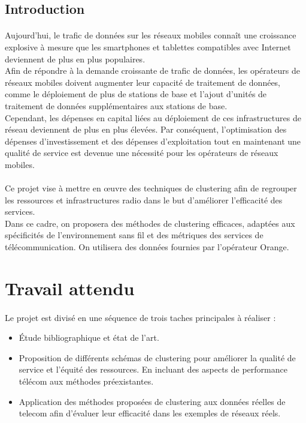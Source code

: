 \documentclass{article}
\begin{document}
  \begin{center}
    \section*{\LARGE{Introduction}}
\end{center}
\Large{\paragraph{}
      Aujourd'hui, le trafic de données sur les réseaux mobiles connaît une croissance explosive à mesure que les smartphones et tablettes compatibles avec Internet deviennent de plus en plus populaires.\\
Afin de répondre à la demande croissante de trafic de données, les opérateurs de réseaux mobiles doivent augmenter leur capacité de traitement de données, comme le déploiement de plus de stations de base et l'ajout d'unités de traitement de données supplémentaires aux stations de base. \\
Cependant, les dépenses en capital liées au déploiement de ces infrastructures de réseau deviennent de plus en plus élevées. Par conséquent, l'optimisation des dépenses d'investissement et des dépenses d'exploitation tout en maintenant une qualité de service est devenue une nécessité pour les opérateurs de réseaux mobiles.
\paragraph{}
Ce projet vise à mettre en œuvre des techniques de clustering afin de regrouper les ressources et infrastructures radio dans le but d'améliorer l'efficacité des services. \\
Dans ce cadre, on proposera des méthodes de clustering efficaces, adaptées aux spécificités de l'environnement sans fil et des métriques des services de télécommunication. On utilisera des données fournies par l'opérateur Orange.
}
\newpage
\section{Travail attendu}
\paragraph{}
 Le projet est divisé en une séquence de trois taches principales à réaliser : \\
\begin{itemize}
    \item Étude bibliographique et état de l'art. 
    \item Proposition de différents schémas de clustering pour améliorer la qualité de service et l'équité des ressources. En incluant des aspects de performance télécom aux méthodes préexistantes.
    \item Application des méthodes proposées de clustering aux données réelles de telecom afin d'évaluer leur efficacité dans les exemples de réseaux réels.
\end{itemize}
\end{document}
